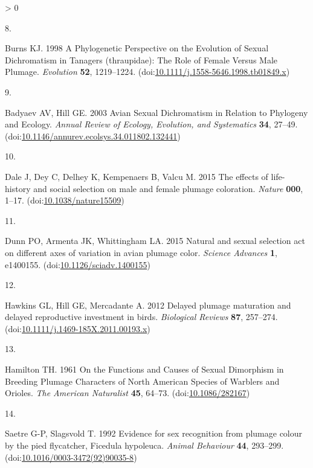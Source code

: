 \documentclass[
  a4paper,
]{article}
\newlength{\cslhangindent}
\newlength{\csllabelwidth}
\newenvironment{CSLReferences}[2] %
 {%
  \setlength{\parindent}{0pt}
  \ifodd #1 \everypar{\setlength{\hangindent}{\cslhangindent}}\ignorespaces\fi
  \ifnum #2 > 0
  \setlength{\parskip}{#2\baselineskip}
  \fi
 }%
 {}
\newcommand{\CSLLeftMargin}[1]{\parbox[t]{\csllabelwidth}{#1}}
\newcommand{\CSLRightInline}[1]{\parbox[t]{\linewidth - \csllabelwidth}{#1}\break}
\begin{document}
\begin{CSLReferences}{0}{0}
\leavevmode\hypertarget{ref-burns1998}{}%
\CSLLeftMargin{8. }
\CSLRightInline{Burns KJ. 1998 A {Phylogenetic Perspective} on the
{Evolution} of {Sexual Dichromatism} in {Tanagers} (thraupidae): {The
Role} of {Female Versus Male Plumage}. \emph{Evolution} \textbf{52},
1219--1224.
(doi:\href{https://doi.org/10.1111/j.1558-5646.1998.tb01849.x}{10.1111/j.1558-5646.1998.tb01849.x})}

\leavevmode\hypertarget{ref-badyaev2003}{}%
\CSLLeftMargin{9. }
\CSLRightInline{Badyaev AV, Hill GE. 2003 Avian {Sexual Dichromatism} in
{Relation} to {Phylogeny} and {Ecology}. \emph{Annual Review of Ecology,
Evolution, and Systematics} \textbf{34}, 27--49.
(doi:\href{https://doi.org/10.1146/annurev.ecolsys.34.011802.132441}{10.1146/annurev.ecolsys.34.011802.132441})}

\leavevmode\hypertarget{ref-dale2015}{}%
\CSLLeftMargin{10. }
\CSLRightInline{Dale J, Dey C, Delhey K, Kempenaers B, Valcu M. 2015 The
effects of life-history and social selection on male and female plumage
coloration. \emph{Nature} \textbf{000}, 1--17.
(doi:\href{https://doi.org/10.1038/nature15509}{10.1038/nature15509})}

\leavevmode\hypertarget{ref-dunn2015}{}%
\CSLLeftMargin{11. }
\CSLRightInline{Dunn PO, Armenta JK, Whittingham LA. 2015 Natural and
sexual selection act on different axes of variation in avian plumage
color. \emph{Science Advances} \textbf{1}, e1400155.
(doi:\href{https://doi.org/10.1126/sciadv.1400155}{10.1126/sciadv.1400155})}

\leavevmode\hypertarget{ref-hawkins2012}{}%
\CSLLeftMargin{12. }
\CSLRightInline{Hawkins GL, Hill GE, Mercadante A. 2012 Delayed plumage
maturation and delayed reproductive investment in birds.
\emph{Biological Reviews} \textbf{87}, 257--274.
(doi:\href{https://doi.org/10.1111/j.1469-185X.2011.00193.x}{10.1111/j.1469-185X.2011.00193.x})}

\leavevmode\hypertarget{ref-hamilton1961}{}%
\CSLLeftMargin{13. }
\CSLRightInline{Hamilton TH. 1961 On the {Functions} and {Causes} of
{Sexual Dimorphism} in {Breeding Plumage Characters} of {North American
Species} of {Warblers} and {Orioles}. \emph{The American Naturalist}
\textbf{45}, 64--73.
(doi:\href{https://doi.org/10.1086/282167}{10.1086/282167})}

\leavevmode\hypertarget{ref-saetre1992}{}%
\CSLLeftMargin{14. }
\CSLRightInline{Saetre G-P, Slagsvold T. 1992 Evidence for sex
recognition from plumage colour by the pied flycatcher, {Ficedula}
hypoleuca. \emph{Animal Behaviour} \textbf{44}, 293--299.
(doi:\href{https://doi.org/10.1016/0003-3472(92)90035-8}{10.1016/0003-3472(92)90035-8})}


\end{CSLReferences}
\end{document}
